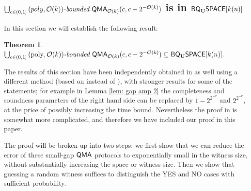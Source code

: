 \documentclass[11pt]{article}
\newtheorem{theorem}{Theorem}
\theoremstyle{definition}
\theoremstyle{remark}
\newcommand\QMA{{\sf{QMA}}}
\newcommand\bddQMA[5]{{\left(#1,#2\right)}\textit{-bounded }\QMA_{#3}(#4,#5)}
\newcommand{\classfont}{\sf}
\newcommand{\Unitary}{\mathbf{U}}
\newcommand{\unitaryBQSPACE}[1]{{\classfont{BQ}_\Unitary\classfont{SPACE}}[#1]}
\newcommand\bigoh{\mathcal{O}}
\DeclareMathOperator{\poly}{poly}
\begin{document}
\subsection{$\bigcup_{c \in (0,1]}{\bddQMA{poly}{\bigoh(k)}{\bigoh(k)}{c}{c-2^{-\bigoh(k)}}}$ is in $\unitaryBQSPACE{k(n)}$} \label{subsec:bddqma-in-bqspace}
In this section we will establish the following result:
\begin{theorem} \label{thm: pspace upper bound}$
\bigcup_{c \in (0,1]}\bddQMA{\poly}{\bigoh(k)}{\bigoh(k)}{c}{c-2^{-\bigoh(k)}} \subseteq \unitaryBQSPACE{k(n)}$.
\end{theorem}
The results of this section have been independently obtained in \cite{fklmn16} as well using a different method (based on \cite{kln15} instead of \cite{nwz11}), with stronger results for some of the statements; for example in Lemma \ref{lem: gap amp 2} the completeness and soundness parameters of the right hand side can be replaced by $1-2^{2^{-r}}$ and $2^{2^{-r}}$, at the price of possibly increasing the time bound. Nevertheless the proof in \cite{fklmn16} is somewhat more complicated, and therefore we have included our proof in this paper.

The proof will be broken up into two steps: we first show that we can reduce the error of these small-gap $\QMA$ protocols to exponentially small in the witness size, without substantially increasing the space or witness size. Then we show that guessing a random witness suffices to distinguish the YES and NO cases with sufficient probability.
\end{document}
